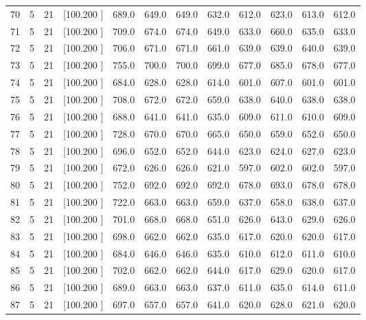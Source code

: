 \documentclass[12pt,a4paper]{article}
\begin{document}
\begin{center}
{\begin{tabular}{r r r r r r r r r r r r}
  70&  5& 21&[100.200   ]&   689.0&   649.0&   649.0&   632.0&   612.0&   623.0&   613.0&   612.0\\[-0.02in]
  71&  5& 21&[100.200   ]&   709.0&   674.0&   674.0&   649.0&   633.0&   660.0&   635.0&   633.0\\[-0.02in]
  72&  5& 21&[100.200   ]&   706.0&   671.0&   671.0&   661.0&   639.0&   639.0&   640.0&   639.0\\[-0.02in]
  73&  5& 21&[100.200   ]&   755.0&   700.0&   700.0&   699.0&   677.0&   685.0&   678.0&   677.0\\[-0.02in]
  74&  5& 21&[100.200   ]&   684.0&   628.0&   628.0&   614.0&   601.0&   607.0&   601.0&   601.0\\[-0.02in]
  75&  5& 21&[100.200   ]&   708.0&   672.0&   672.0&   659.0&   638.0&   640.0&   638.0&   638.0\\[-0.02in]
  76&  5& 21&[100.200   ]&   688.0&   641.0&   641.0&   635.0&   609.0&   611.0&   610.0&   609.0\\[-0.02in]
  77&  5& 21&[100.200   ]&   728.0&   670.0&   670.0&   665.0&   650.0&   659.0&   652.0&   650.0\\[-0.02in]
  78&  5& 21&[100.200   ]&   696.0&   652.0&   652.0&   644.0&   623.0&   624.0&   627.0&   623.0\\[-0.02in]
  79&  5& 21&[100.200   ]&   672.0&   626.0&   626.0&   621.0&   597.0&   602.0&   602.0&   597.0\\[-0.02in]
  80&  5& 21&[100.200   ]&   752.0&   692.0&   692.0&   692.0&   678.0&   693.0&   678.0&   678.0\\[-0.02in]
  81&  5& 21&[100.200   ]&   722.0&   663.0&   663.0&   659.0&   637.0&   658.0&   638.0&   637.0\\[-0.02in]
  82&  5& 21&[100.200   ]&   701.0&   668.0&   668.0&   651.0&   626.0&   643.0&   629.0&   626.0\\[-0.02in]
  83&  5& 21&[100.200   ]&   698.0&   662.0&   662.0&   635.0&   617.0&   620.0&   620.0&   617.0\\[-0.02in]
  84&  5& 21&[100.200   ]&   684.0&   646.0&   646.0&   635.0&   610.0&   612.0&   611.0&   610.0\\[-0.02in]
  85&  5& 21&[100.200   ]&   702.0&   662.0&   662.0&   644.0&   617.0&   629.0&   620.0&   617.0\\[-0.02in]
  86&  5& 21&[100.200   ]&   689.0&   663.0&   663.0&   637.0&   611.0&   635.0&   614.0&   611.0\\[-0.02in]
  87&  5& 21&[100.200   ]&   697.0&   657.0&   657.0&   641.0&   620.0&   628.0&   621.0&   620.0\\[-0.02in]

\end{tabular}}
\end{center}
\end{document}
